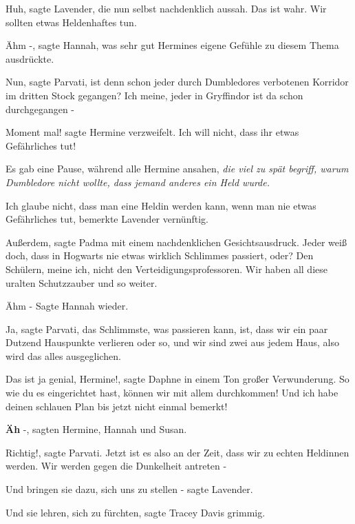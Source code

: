 \glqq{}Huh\grqq{}, sagte Lavender, die nun selbst nachdenklich aussah. \glqq{}Das
ist wahr. Wir sollten etwas Heldenhaftes tun.\grqq{}

\glqq{}Ähm -\grqq{}, sagte Hannah, was sehr gut Hermines eigene Gefühle zu diesem
Thema ausdrückte.

\glqq{}Nun\grqq{}, sagte Parvati, \glqq{}ist denn schon jeder durch Dumbledores
verbotenen Korridor im dritten Stock gegangen? Ich meine, jeder in Gryffindor
ist da schon durchgegangen -\grqq{}

\glqq{}Moment mal!\grqq{} sagte Hermine verzweifelt. \glqq{}Ich will nicht, dass
ihr etwas Gefährliches tut!\grqq{}

Es gab eine Pause, während alle Hermine ansahen, \emph{die viel zu spät begriff,
warum Dumbledore nicht wollte, dass jemand anderes ein Held wurde.}

\glqq{}Ich glaube nicht, dass man eine Heldin werden kann, wenn man nie etwas
Gefährliches tut\grqq{}, bemerkte Lavender vernünftig.

\glqq{}Außerdem\grqq{}, sagte Padma mit einem nachdenklichen Gesichtsausdruck.
\glqq{}Jeder weiß doch, dass in Hogwarts nie etwas wirklich Schlimmes passiert,
oder? Den Schülern, meine ich, nicht den Verteidigungsprofessoren. Wir haben all
diese uralten Schutzzauber und so weiter.\grqq{}

\glqq{}Ähm -\grqq{} Sagte Hannah wieder.

\glqq{}Ja\grqq{}, sagte Parvati, \glqq{}das Schlimmste, was passieren kann, ist,
dass wir ein paar Dutzend Hauspunkte verlieren oder so, und wir sind zwei aus
jedem Haus, also wird das alles ausgeglichen.\grqq{}

\glqq{}Das ist ja genial, Hermine!\grqq{}, sagte Daphne in einem Ton großer
Verwunderung. \glqq{}So wie du es eingerichtet hast, können wir mit allem
durchkommen! Und ich habe deinen schlauen Plan bis jetzt nicht einmal
bemerkt!\grqq{}

\glqq{}\textbf{Äh} -\grqq{}, sagten Hermine, Hannah und Susan.

\glqq{}Richtig!\grqq{}, sagte Parvati. \glqq{}Jetzt ist es also an der Zeit, dass
wir zu echten Heldinnen werden. Wir werden gegen die Dunkelheit antreten
-\grqq{}

\glqq{}Und bringen sie dazu, sich uns zu stellen -\grqq{} sagte Lavender.

\glqq{}Und sie lehren, sich zu fürchten\grqq{}, sagte Tracey Davis grimmig.

